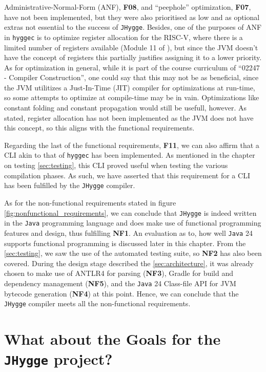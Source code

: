 Administrative-Normal-Form (ANF), \textbf{F08}, and ``peephole'' optimization, \textbf{F07}, have not been implemented, but they were also prioritised as low and as optional
extras not essential to the success of \texttt{JHygge}. Besides, one of the purposes of ANF in \texttt{hyggec} is to optimize register
allocation for the RISC-V, where there is a limited number of registers available (Module 11 of \cite{lecture_notes}), but since the JVM doesn't have the concept of registers
this partially justifies assigning it to a lower priority. As for optimization in general, while it is part of the course
curriculum of ``02247 - Compiler Construction'', one could say that this may not be as beneficial, since the JVM utilitizes a Just-In-Time (JIT)
compiler for optimizations at run-time, so some attempts to optimize at compile-time may be in vain. Optimizations like constant folding
and constant propagation would still be usefull, however. As stated, register allocation has not been implemented as the JVM does not have
this concept, so this aligns with the functional requirements.

Regarding the last of the functional requirements, \textbf{F11}, we can also affirm that a CLI akin to that of \texttt{hyggec} has been implemented. As
mentioned in the chapter on testing \ref{sec:testing}, this CLI proved useful when testing the various compilation phases.
As such, we have asserted that this requirement for a CLI has been fulfilled by the \texttt{JHygge} compiler.

As for the non-functional requirements stated in figure \ref{fig:nonfunctional_requirements}, we can conclude that \texttt{JHygge} is indeed written in the \texttt{Java} programming language and does make use of functional programming features and design,
thus fulfilling \textbf{NF1}.
An evaluation as to, how well \texttt{Java} 24 supports functional programming
is discussed later in this chapter. From the \ref{sec:testing}, we saw the use of the automated testing suite, so \textbf{NF2}
has also been covered. During the design stage described the \ref{sec:architecture}, it was already chosen to make use
of ANTLR4 for parsing (\textbf{NF3}), Gradle for build and dependency management (\textbf{NF5}), and
the \texttt{Java} 24 Class-file API\cite{jep484} for JVM bytecode generation (\textbf{NF4}) at this point.
Hence, we can conclude that the \texttt{JHygge} compiler meets all the non-functional requirements.

\section{What about the Goals for the \texttt{JHygge} project?}

